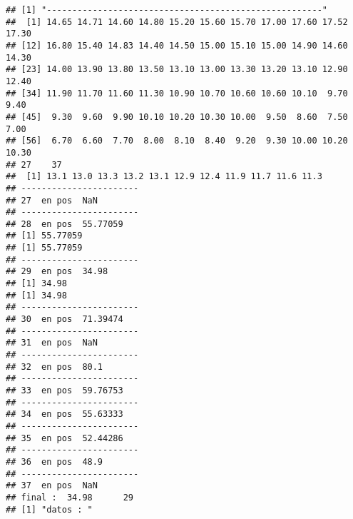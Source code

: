 \documentclass[]{article}
\begin{document}
\begin{verbatim}
## [1] "------------------------------------------------------"
##  [1] 14.65 14.71 14.60 14.80 15.20 15.60 15.70 17.00 17.60 17.52 17.30
## [12] 16.80 15.40 14.83 14.40 14.50 15.00 15.10 15.00 14.90 14.60 14.30
## [23] 14.00 13.90 13.80 13.50 13.10 13.00 13.30 13.20 13.10 12.90 12.40
## [34] 11.90 11.70 11.60 11.30 10.90 10.70 10.60 10.60 10.10  9.70  9.40
## [45]  9.30  9.60  9.90 10.10 10.20 10.30 10.00  9.50  8.60  7.50  7.00
## [56]  6.70  6.60  7.70  8.00  8.10  8.40  9.20  9.30 10.00 10.20 10.30
## 27    37 
##  [1] 13.1 13.0 13.3 13.2 13.1 12.9 12.4 11.9 11.7 11.6 11.3
## -----------------------
## 27  en pos  NaN 
## -----------------------
## 28  en pos  55.77059 
## [1] 55.77059
## [1] 55.77059
## -----------------------
## 29  en pos  34.98 
## [1] 34.98
## [1] 34.98
## -----------------------
## 30  en pos  71.39474 
## -----------------------
## 31  en pos  NaN 
## -----------------------
## 32  en pos  80.1 
## -----------------------
## 33  en pos  59.76753 
## -----------------------
## 34  en pos  55.63333 
## -----------------------
## 35  en pos  52.44286 
## -----------------------
## 36  en pos  48.9 
## -----------------------
## 37  en pos  NaN 
## final :  34.98      29 
## [1] "datos : "
\end{verbatim}
\end{document}
